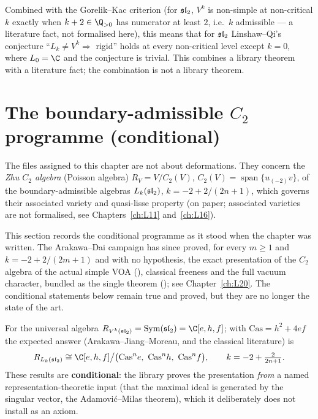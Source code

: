 \begin{remark}\label{l09:rem:extension}
Combined with the Gorelik--Kac criterion (for $\mathfrak{sl}_2$, $V^k$ is non-simple at non-critical $k$ exactly when
$k+2\in\Q_{>0}$ has numerator at least $2$, i.e.\ $k$ admissible --- a literature fact, not formalised here), this
means that for $\mathfrak{sl}_2$ Linshaw--Qi's conjecture ``$L_k\neq V^k\Rightarrow$ rigid'' holds at every non-critical
level except $k=0$, where $L_0 = \C$ and the conjecture is trivial. This combines a library theorem with a literature
fact; the combination is not a library theorem.
\end{remark}

\section{The boundary-admissible \texorpdfstring{$C_2$}{C2} programme (conditional)}\label{l09:sec:boundary}

The files  assigned to this chapter are not about deformations. They
concern the \emph{Zhu $C_2$ algebra} (Poisson algebra) $R_V = V/C_2(V)$, $C_2(V) =
\operatorname{span}\{u_{(-2)}v\}$, of the boundary-admissible algebras $L_k(\mathfrak{sl}_2)$,
$k = -2 + 2/(2n+1)$, which governs their associated variety and quasi-lisse property (on paper; associated varieties are not formalised,
see Chapters~\ref{ch:L11} and~\ref{ch:L16}).

\begin{warning}[title={Superseded: now proved unconditionally for every boundary level}]
This section records the conditional programme as it stood when the chapter was written. The Arakawa--Dai campaign
has since proved, for every $m\ge1$ and $k=-2+2/(2m+1)$ and with no hypothesis, the exact presentation of the $C_2$
algebra of the actual simple VOA (), classical freeness and the
full vacuum character, bundled as the single theorem
\allowbreak{}\allowbreak{}
(); see Chapter~\ref{ch:L20}. The conditional statements below remain true and proved, but they are no
longer the state of the art.
\end{warning}

For the universal algebra $R_{V^k(\lninesl)} = \operatorname{Sym}(\lninesl)
= \C[e,h,f]$; with $\mathrm{Cas} = h^2+4ef$ the expected answer (Arakawa--Jiang--Moreau, and the
classical literature) is
\begin{equation*}
  R_{L_k(\lninesl)} \cong \C[e,h,f]\big/\bigl(\mathrm{Cas}^n e,\ \mathrm{Cas}^n h,\ \mathrm{Cas}^n f\bigr),\qquad
  k = -2+\tfrac{2}{2n+1}.
\end{equation*}
These results are \textbf{conditional}: the library proves the presentation \emph{from} a named
representation-theoretic input (that the maximal ideal is generated by the singular vector, the
Adamovi\'c--Milas theorem), which it deliberately does not install as an axiom.

